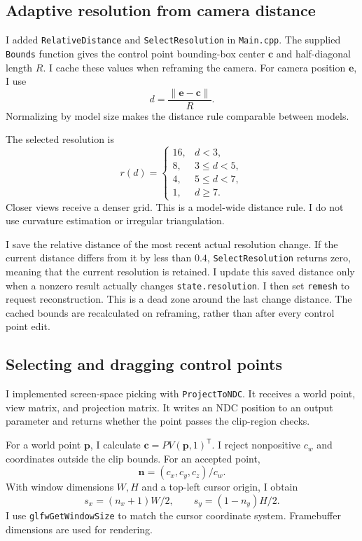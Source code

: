 \documentclass[acmtog]{acmart}
\begin{document}
\subsection{Adaptive resolution from camera distance}
I added \texttt{RelativeDistance} and \texttt{SelectResolution} in \texttt{Main.cpp}. The supplied \texttt{Bounds} function gives the control point bounding-box center $\mathbf c$ and half-diagonal length $R$. I cache these values when reframing the camera. For camera position $\mathbf e$, I use
\begin{equation}
d=\frac{\|\mathbf e-\mathbf c\|}{R}.
\end{equation}
Normalizing by model size makes the distance rule comparable between models.

The selected resolution is
\begin{equation}
r(d)=
\begin{cases}
16,&d<3,\\
8,&3\leq d<5,\\
4,&5\leq d<7,\\
1,&d\geq7.
\end{cases}
\end{equation}
Closer views receive a denser grid. This is a model-wide distance rule. I do not use curvature estimation or irregular triangulation.

I save the relative distance of the most recent actual resolution change. If the current distance differs from it by less than $0.4$, \texttt{SelectResolution} returns zero, meaning that the current resolution is retained. I update this saved distance only when a nonzero result actually changes \texttt{state.resolution}. I then set \texttt{remesh} to request reconstruction. This is a dead zone around the last change distance. The cached bounds are recalculated on reframing, rather than after every control point edit.

\subsection{Selecting and dragging control points}
I implemented screen-space picking with \texttt{ProjectToNDC}. It receives a world point, view matrix, and projection matrix. It writes an NDC position to an output parameter and returns whether the point passes the clip-region checks.

For a world point $\mathbf p$, I calculate $\mathbf c=PV(\mathbf p,1)^{\mathsf T}$. I reject nonpositive $c_w$ and coordinates outside the clip bounds. For an accepted point,
\begin{equation}
\mathbf n=(c_x,c_y,c_z)/c_w.
\end{equation}
With window dimensions $W,H$ and a top-left cursor origin, I obtain
\begin{equation}
s_x=(n_x+1)W/2,\qquad s_y=(1-n_y)H/2.
\end{equation}
I use \texttt{glfwGetWindowSize} to match the cursor coordinate system. Framebuffer dimensions are used for rendering.
\end{document}
